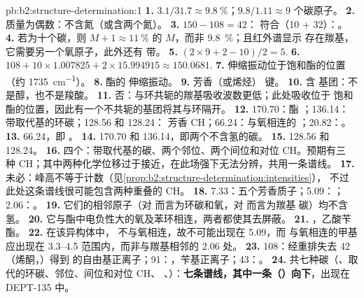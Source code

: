 \begin{solution}{pb:b2:structure-determination:1}
\textbf{1.} $3.1/31.7 \approx 9.8~\%$；$9.8/1.11 \approx 9$ 个碳原子。
\textbf{2.} 质量为偶数：不含氮（或含两个氮）。
\textbf{3.} $150 - 108 = 42$： 符合（10 + 32）：。
\textbf{4.} 若为十个碳，则 $M+1 \approx 11~\%$ 的 $M$，而非 9.8~\%；且红外谱显示
存在羰基，它需要另一个氧原子，此外还有  带。
\textbf{5.} $(2 \times 9 + 2 - 10)/2 = 5$.
\textbf{6.} $108 + 10 \times 1.007825 + 2 \times 15.994915 \approx 150.0681$.
\textbf{7.}  伸缩振动位于饱和酯的位置（约 \qty{1735}{cm^{-1}}）。
\textbf{8.} 酯的  伸缩振动。
\textbf{9.} 芳香（或烯烃） 键。
\textbf{10.} 含  基团：不是醇，也不是羧酸。
\textbf{11.} 否：与环共轭的羰基吸收波数更低；此处吸收位于
饱和酯的位置，因此有一个不共轭的基团将其与环隔开。
\textbf{12.} 170.70：酯 ；136.14：带取代基的环碳；128.56 和 128.24：
芳香 CH；66.24：与氧相连的 ；20.82：。
\textbf{13.} 66.24，即 。
\textbf{14.} 170.70 和 136.14，即两个不含氢的碳。
\textbf{15.} 128.56 和 128.24。
\textbf{16.} 四个：带取代基的碳、两个邻位、两个间位和对位 CH。预期有三
种 CH；其中两种化学位移过于接近，在此场强下无法分辨，共用一条谱线。
\textbf{17.} 未必：峰高不等于计数（见\cref{prop:b2:structure-determination:intensities}），
不过此处这条谱线很可能包含两种重叠的 CH。
\textbf{18.} 7.33：五个芳香质子；5.09：；2.06：。
\textbf{19.} 它们的相邻原子（对  而言为环碳和氧，对  而言为羰基
碳）均不含氢。
\textbf{20.} 它与酯中电负性大的氧及苯环相连，两者都使其去屏蔽。
\textbf{21.} ，乙酸苄酯。
\textbf{22.} 在该异构体中， 不与氧相连，故不可能出现在 5.09，而
与氧相连的甲基应出现在 3.3--4.5 范围内，而非与羰基相邻的 2.06 处。
\textbf{23.} 108：经重排失去 42（烯酮，）得到 
的自由基正离子；91：，苄基正离子；43：。
\textbf{24.} 共七种碳（、取代的环碳、邻位、间位和对位 CH、
、）：\textbf{七条谱线，其中一条（）向下}，出现在 DEPT-135 中。
\end{solution}
